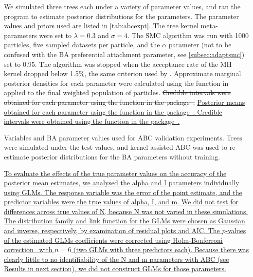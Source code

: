 We simulated three trees each under a variety of parameter values, and ran the
 program to estimate posterior distributions for the
parameters. The parameter values and priors used are listed in
\cref{tab:abcexpt}. The tree kernel meta-parameters were set to $\lambda = 0.3$
and $\sigma = 4$. The \gls{SMC} algorithm was run with 1000 particles, five
sampled datasets per particle, and the $\alpha$ parameter (not to be confused
with the \gls{BA} preferential attachment parameter, see
\cref{subsec:adaptsmc}) set to 0.95. The algorithm was stopped when the
acceptance rate of the \gls{MH} kernel dropped below 1.5\%, the same criterion
used by \citeauthor{del2012adaptive}. Approximate marginal posterior densities
for each parameter were calculated using the  function in
 applied to the final weighted population of particles.
{\color{red}\sout{Credible intervals were obtained for each parameter using the
 function in the 
package~\autocite{plummer2006coda}.}} {\color{blue}\uline{Posterior means
obtained for each parameter using the  function in the
 package~\autocite{harrell2016hmisc}. Credible intervals were
obtained using the  function in the 
package~\autocite{snow2013teachingdemos}.}}

\begin{table}[ht]
  \centering
  
  \caption[Variables used in grid search experiments]
  {
    Variables and \gls{BA} parameter values used for \gls{ABC} validation
    experiments. Trees were simulated under the test values, and
    kernel-assisted \gls{ABC} was used to re-estimate posterior distributions for the
    \gls{BA} parameters without training.
  }
  \label{tab:abcexpt}
\end{table}

{\color{blue}\uline{
To evaluate the effects of the true parameter values on the accuracy of the
posterior mean estimates, we analysed the \gls{alpha} and \gls{I} parameters
individually using \glspl{GLM}. The response variable was the error of the
point estimate, and the predictor variables were the true values of
\gls{alpha}, \gls{I}, and \gls{m}. We did not test for differences across true
values of \gls{N}, because \gls{N} was not varied in these simulations. The
distribution family and link function for the \glspl{GLM} were chosen as
Gaussian and inverse, respectively, by examination of residual plots and
\gls{AIC}. The $p$-values of the estimated \glspl{GLM} coefficients were
corrected using Holm-Bonferroni correction~\autocite{holm1979simple} with $n =
6$ (two \glspl{GLM} with three predictors each). Because there was clearly
little to no identifiability of the \gls{N} and \gls{m} parameters with
\gls{ABC} (see Results in next section), we did not construct \glspl{GLM} for
those parameters. }}

